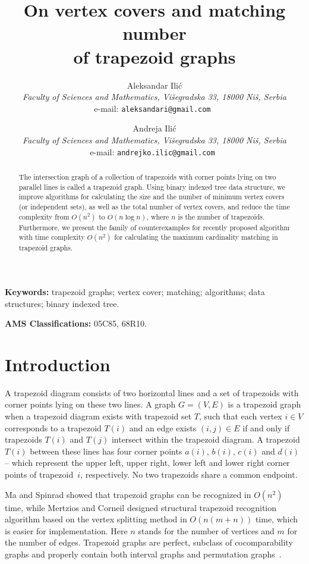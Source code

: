 \documentclass[11pt,letter]{article}
\title {
    \bf {On vertex covers and matching number \\ of trapezoid graphs}
}
\author
{
{\large \sc Aleksandar Ili\' c \footnotemark[3]} \\
{\em \normalsize Faculty of Sciences and Mathematics, Vi\v segradska 33, 18000 Ni\v s, Serbia} \\
{\normalsize e-mail: { \tt aleksandari@gmail.com }}
\and
{\large \sc Andreja Ili\' c} \\
{\em \normalsize Faculty of Sciences and Mathematics, Vi\v segradska 33, 18000 Ni\v s, Serbia} \\
{\normalsize e-mail: { \tt andrejko.ilic@gmail.com }} }
\begin{document}
\maketitle


\begin{abstract}
The intersection graph of a collection of trapezoids with corner points lying on two parallel lines
is called a trapezoid graph. Using binary indexed tree data structure, we improve algorithms for
calculating the size and the number of minimum vertex covers (or independent sets), as well as the
total number of vertex covers, and reduce the time complexity from $O (n^2)$ to $O (n \log n)$,
where $n$ is the number of trapezoids. Furthermore, we present the family of counterexamples for
recently proposed algorithm with time complexity $O (n^2)$ for calculating the maximum cardinality
matching in trapezoid graphs.
\end{abstract}

{\bf {Keywords:}} trapezoid graphs; vertex cover; matching; algorithms; data structures; binary
indexed tree. \vspace{0.2cm}

{{\bf AMS Classifications:} 05C85, 68R10.} \vspace{0.2cm}



\section{Introduction}


A trapezoid diagram consists of two horizontal lines and a set of trapezoids with corner points
lying on these two lines. A graph $G = (V, E)$ is a trapezoid graph when a trapezoid diagram exists
with trapezoid set $T$, such that each vertex $i \in V$ corresponds to a trapezoid $T (i)$ and an
edge exists $(i, j) \in E$ if and only if trapezoids $T (i)$ and $T (j)$ intersect within the
trapezoid diagram. A trapezoid $T (i)$ between these lines has four corner points $a(i)$, $b(i)$,
$c(i)$ and $d(i)$ -- which represent the upper left, upper right, lower left and lower right corner
points of trapezoid~$i$, respectively. No two trapezoids share a common endpoint.

Ma and Spinrad \cite{MaSp94} showed that trapezoid graphs can be recognized in $O(n^2)$ time, while
Mertzios and Corneil \cite{MeCo09} designed structural trapezoid recognition algorithm based on the
vertex splitting method in $O (n (m + n))$ time, which is easier for implementation. Here $n$
stands for the number of vertices and $m$ for the number of edges. Trapezoid graphs are perfect,
subclass of cocomparability graphs and properly contain both interval graphs and permutation
graphs~\cite{Li07}.
\end{document}
